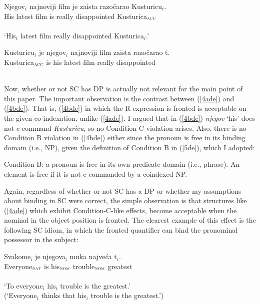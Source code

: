 \documentclass[
    output=paper,
    colorlinks,
    citecolor=brown,
]{langscibook}
\begin{document}
\begin{exe}
\ex \label{4de}
\begin{xlist}
\ex \label{4ade}
\gll *Njegov$_{i}$ najnoviji film    je  zaista razočarao  Kusturicu$_{i}$.\\
His latest film is really disappointed Kusturica$_{\textsc{acc}}$\\\\
‘His$_{i}$ latest film really disappointed Kusturica$_{i}$.’

\ex \label{4bde}
\gll Kusturicu$_{i}$ je     njegov$_{i}$  najnoviji film     zaista razočarao     t.\\
Kusturica$_{\textsc{acc}}$ is his latest film really disappointed\\\\
\end{xlist}
\end{exe}

Now, whether or not SC has DP is actually not relevant for the main point of this paper. The important observation is the contrast between (\ref{4ade}) and (\ref{4bde}). That is, (\ref{4bde}) in which the R-expression is fronted is acceptable on the given co-indexation, unlike (\ref{4ade}). I argued that in (\ref{4bde}) \textit{njegov} ‘his’ does not c-command \textit{Kusturicu}, so no Condition C violation arises. Also, there is no Condition B violation in (\ref{4bde}) either since the pronoun is free in its binding domain (i.e., NP), given the definition of Condition B in (\ref{5de}), which I adopted:

\begin{exe}
\ex \label{5de}
Condition B: a pronoun is free in its own predicate domain (i.e., phrase). An element is free if it is not c-commanded by a coindexed NP.
\end{exe}

Again, regardless of whether or not SC has a DP or whether my assumptions about binding in SC were correct, the simple observation is that structures like (\ref{4ade}) which exhibit Condition-C-like effects, become acceptable when the nominal in the object position is fronted. The clearest example of this effect is the following SC idiom, in which the fronted quantifier can bind the pronominal possessor in the subject:

\begin{exe}
\ex \label{6de}
\gll Svakome$_{i}$  je njegova$_{i}$ muka najveća  t$_{i}$.\\
Everyone$_{\textsc{dat}}$ is his$_{\textsc{nom}}$ trouble$_{\textsc{nom}}$ greatest\\\\
‘To everyone$_{i}$ his$_{i}$ trouble is the greatest.’ \\
(‘Everyone$_{i}$ thinks that his$_{i}$ trouble is the greatest.’)
\end{exe}
\end{document}
